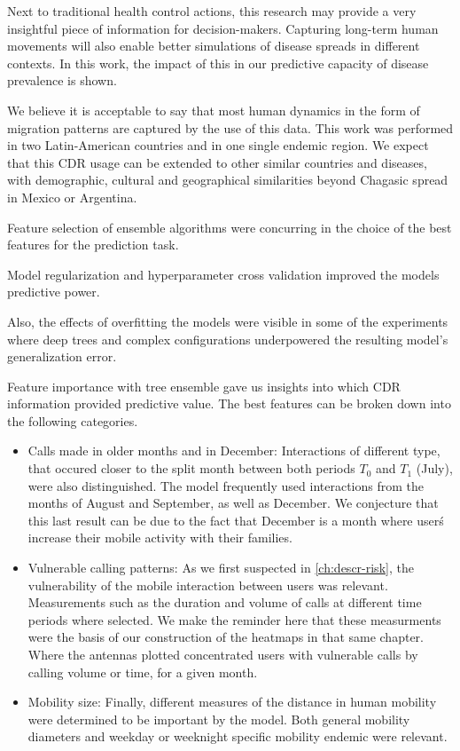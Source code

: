 Next to traditional health control actions, this research may provide a very insightful piece of information for decision-makers.
Capturing long-term human movements will also enable better simulations of disease spreads in different contexts.
In this work, the impact of this in our predictive capacity of disease prevalence is shown.



We believe it is acceptable to say that most human dynamics in the form of migration patterns are captured by the use of this data.
This work was performed in two Latin-American countries and in one single endemic region.
We expect that this CDR usage can be extended to other similar countries and diseases, with demographic, cultural and geographical similarities beyond Chagasic spread in Mexico or Argentina.


Feature selection of ensemble algorithms were concurring in the choice of the best features for the prediction task.

Model regularization and hyperparameter cross validation improved the models predictive power.

Also, the effects of overfitting the models were visible in some of the experiments where deep trees and complex configurations underpowered the resulting model's generalization error.

Feature importance with tree ensemble gave us insights into which CDR information provided
predictive value.
The best features can be broken down into the following categories.

\begin{itemize}

    \item Calls made in older months and in December: Interactions of different type, that occured closer to the split month between both periods $T_0$ and $T_1$ (July), were also distinguished.
    The model frequently used interactions from the months of August and September, as well as December.
    We conjecture that this last result can be due to the fact that December is a month where user\'s increase their mobile activity with their families.

    \item Vulnerable calling patterns: As we first suspected in \cref{ch:descr-risk}, the vulnerability of the mobile interaction between users was relevant.
    Measurements such as the duration and volume of calls at different time periods where selected.
    We make the reminder here that these measurments were the basis of our construction of the heatmaps in that same chapter.
    Where the antennas plotted concentrated users with vulnerable calls by calling volume or time, for a given month.

    \item Mobility size: Finally, different measures of the distance in human mobility were
determined to be important by the model.
Both general mobility diameters and weekday or weeknight specific mobility endemic were relevant.

\end{itemize}

